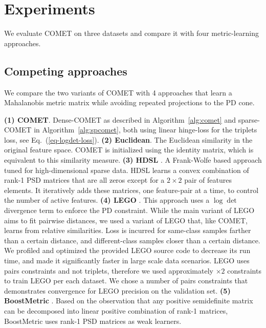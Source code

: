 \documentclass[twoside,11pt]{article}
\renewcommand{\eqref}[1]{Eq.~(\ref{#1})}
\begin{document}

\vspace{-6pt}
\section{Experiments}\vskip -5pt
We evaluate COMET on three datasets and compare it with four metric-learning approaches. 

\vspace{-6pt}
\subsection{Competing approaches}\vskip -5pt
We compare the two variants of COMET with 4 approaches that learn a Mahalanobis metric matrix while avoiding repeated projections to the PD cone.

\noindent \textbf{(1) COMET}. Dense-COMET as described in Algorithm~\ref{alg:comet} and sparse-COMET  in Algorithm~\ref{alg:spcomet}, both using linear hinge-loss for the triplets loss, see \eqref{eq-logdet-loss}. \textbf{(2) Euclidean}. The Euclidean similarity in the original feature space. COMET is initialized using the identity matrix, which is equivalent to this similarity measure.  \textbf{(3) HDSL} \citep{HDSL}. A Frank-Wolfe based approach tuned for high-dimensional sparse data. HDSL learns a convex combination of rank-1 PSD matrices that are all zeros except for a $2\times2$ pair of features elements. It iteratively adds these matrices, one feature-pair at a time, to control the number of active features. \textbf{(4) LEGO} \citep{lego}. This approach uses a $\log \det$ divergence term to enforce the PD constraint. While the main variant of LEGO aims to fit pairwise distances, we used a variant of LEGO that, like COMET, learns from relative similarities. Loss is incurred for same-class samples farther than a certain distance, and different-class samples closer than a certain distance. We profiled and optimized the provided LEGO source code to decrease its run time, and made it significantly faster in large scale data scenarios. LEGO uses pairs constraints and not triplets, therefore we used approximately $\times2$ constraints to train LEGO per each dataset. We chose a number of pairs constraints that demonstrates convergence for LEGO precision on the validation set. \textbf{(5) BoostMetric} \citep{boost}. Based on the observation that any positive semidefinite matrix can be decomposed into linear positive combination of rank-1 matrices, BoostMetric uses rank-1 PSD matrices as weak learners.
\end{document}
